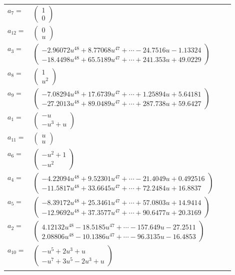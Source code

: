 \documentclass[1p]{elsarticle_modified}
\theoremstyle{definition}
\begin{document}
\begin{tabular}{m{7pt} m{180pt} m{7pt} m{180pt} }
\flushright $a_{7}=$&$\begin{pmatrix}1\\0\end{pmatrix}$ \\
\flushright $a_{12}=$&$\begin{pmatrix}0\\u\end{pmatrix}$ \\
\flushright $a_{3}=$&$\begin{pmatrix}-2.96072 u^{48}+8.77068 u^{47}+\cdots-24.7516 u-1.13324\\-18.4498 u^{48}+65.5189 u^{47}+\cdots+241.353 u+49.0229\end{pmatrix}$ \\
\flushright $a_{8}=$&$\begin{pmatrix}1\\u^2\end{pmatrix}$ \\
\flushright $a_{9}=$&$\begin{pmatrix}-7.08294 u^{48}+17.6739 u^{47}+\cdots+1.25894 u+5.64181\\-27.2013 u^{48}+89.0489 u^{47}+\cdots+287.738 u+59.6427\end{pmatrix}$ \\
\flushright $a_{1}=$&$\begin{pmatrix}- u\\- u^3+u\end{pmatrix}$ \\
\flushright $a_{11}=$&$\begin{pmatrix}u\\u\end{pmatrix}$ \\
\flushright $a_{6}=$&$\begin{pmatrix}- u^2+1\\- u^2\end{pmatrix}$ \\
\flushright $a_{4}=$&$\begin{pmatrix}-4.22094 u^{48}+9.52301 u^{47}+\cdots-21.4049 u+0.492516\\-11.5817 u^{48}+33.6645 u^{47}+\cdots+72.2484 u+16.8837\end{pmatrix}$ \\
\flushright $a_{5}=$&$\begin{pmatrix}-8.39172 u^{48}+25.3461 u^{47}+\cdots+57.0803 u+14.9414\\-12.9692 u^{48}+37.3577 u^{47}+\cdots+90.6477 u+20.3169\end{pmatrix}$ \\
\flushright $a_{2}=$&$\begin{pmatrix}4.12132 u^{48}-18.5185 u^{47}+\cdots-157.649 u-27.2511\\2.08806 u^{48}-10.1386 u^{47}+\cdots-96.3135 u-16.4853\end{pmatrix}$ \\
\flushright $a_{10}=$&$\begin{pmatrix}- u^5+2 u^3+u\\- u^7+3 u^5-2 u^3+u\end{pmatrix}$\\&\end{tabular}
\end{document}
